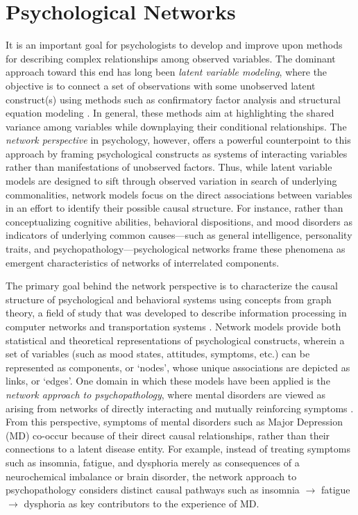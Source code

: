 \section{Psychological Networks}
It is an important goal for psychologists to develop and improve upon methods for describing complex relationships among observed variables. The dominant approach toward this end has long been \textit{latent variable modeling}, where the objective is to connect a set of observations with some unobserved latent construct(s) using methods such as confirmatory factor analysis and structural equation modeling \cite{little2006merits}. In general, these methods aim at highlighting the shared variance among variables while downplaying their conditional relationships. The \textit{network perspective} in psychology, however, offers a powerful counterpoint to this approach by framing psychological constructs as systems of interacting variables rather than manifestations of unobserved factors. Thus, while latent variable models are designed to sift through observed variation in search of underlying commonalities, network models focus on the direct associations between variables in an effort to identify their possible causal structure. For instance, rather than conceptualizing cognitive abilities, behavioral dispositions, and mood disorders as indicators of underlying common causes---such as general intelligence, personality traits, and psychopathology---psychological networks frame these phenomena as emergent characteristics of networks of interrelated components. 

The primary goal behind the network perspective is to characterize the causal structure of psychological and behavioral systems using concepts from graph theory, a field of study that was developed to describe information processing in computer networks and transportation systems \cite{west1996introduction}. Network models provide both statistical and theoretical representations of psychological constructs, wherein a set of variables (such as mood states, attitudes, symptoms, etc.) can be represented as components, or `nodes', whose unique associations are depicted as links, or `edges'. One domain in which these models have been applied is the \textit{network approach to psychopathology}, where mental disorders are viewed as arising from networks of directly interacting and mutually reinforcing symptoms \cite{cramer2010comorbidity,fried2017mental,bringmann2013network,cramer2016major}. From this perspective, symptoms of mental disorders such as Major Depression (MD) co-occur because of their direct causal relationships, rather than their connections to a latent disease entity. For example, instead of treating symptoms such as insomnia, fatigue, and dysphoria merely as consequences of a neurochemical imbalance or brain disorder, the network approach to psychopathology considers distinct causal pathways such as insomnia $\rightarrow$ fatigue $\rightarrow$ dysphoria as key contributors to the experience of MD. 

